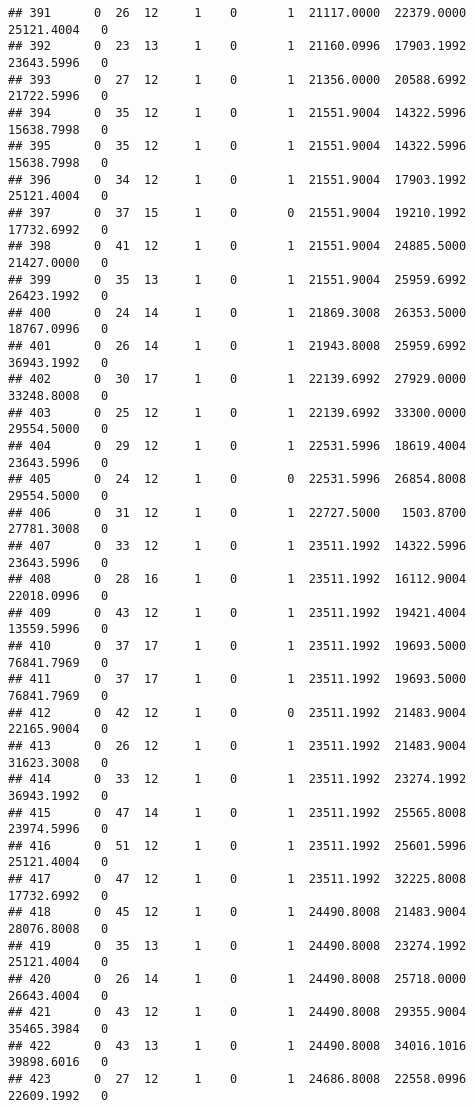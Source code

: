 \documentclass[
]{article}
\begin{document}
\begin{enumerate}
\begin{verbatim}
## 391      0  26  12     1    0       1  21117.0000  22379.0000  25121.4004   0
## 392      0  23  13     1    0       1  21160.0996  17903.1992  23643.5996   0
## 393      0  27  12     1    0       1  21356.0000  20588.6992  21722.5996   0
## 394      0  35  12     1    0       1  21551.9004  14322.5996  15638.7998   0
## 395      0  35  12     1    0       1  21551.9004  14322.5996  15638.7998   0
## 396      0  34  12     1    0       1  21551.9004  17903.1992  25121.4004   0
## 397      0  37  15     1    0       0  21551.9004  19210.1992  17732.6992   0
## 398      0  41  12     1    0       1  21551.9004  24885.5000  21427.0000   0
## 399      0  35  13     1    0       1  21551.9004  25959.6992  26423.1992   0
## 400      0  24  14     1    0       1  21869.3008  26353.5000  18767.0996   0
## 401      0  26  14     1    0       1  21943.8008  25959.6992  36943.1992   0
## 402      0  30  17     1    0       1  22139.6992  27929.0000  33248.8008   0
## 403      0  25  12     1    0       1  22139.6992  33300.0000  29554.5000   0
## 404      0  29  12     1    0       1  22531.5996  18619.4004  23643.5996   0
## 405      0  24  12     1    0       0  22531.5996  26854.8008  29554.5000   0
## 406      0  31  12     1    0       1  22727.5000   1503.8700  27781.3008   0
## 407      0  33  12     1    0       1  23511.1992  14322.5996  23643.5996   0
## 408      0  28  16     1    0       1  23511.1992  16112.9004  22018.0996   0
## 409      0  43  12     1    0       1  23511.1992  19421.4004  13559.5996   0
## 410      0  37  17     1    0       1  23511.1992  19693.5000  76841.7969   0
## 411      0  37  17     1    0       1  23511.1992  19693.5000  76841.7969   0
## 412      0  42  12     1    0       0  23511.1992  21483.9004  22165.9004   0
## 413      0  26  12     1    0       1  23511.1992  21483.9004  31623.3008   0
## 414      0  33  12     1    0       1  23511.1992  23274.1992  36943.1992   0
## 415      0  47  14     1    0       1  23511.1992  25565.8008  23974.5996   0
## 416      0  51  12     1    0       1  23511.1992  25601.5996  25121.4004   0
## 417      0  47  12     1    0       1  23511.1992  32225.8008  17732.6992   0
## 418      0  45  12     1    0       1  24490.8008  21483.9004  28076.8008   0
## 419      0  35  13     1    0       1  24490.8008  23274.1992  25121.4004   0
## 420      0  26  14     1    0       1  24490.8008  25718.0000  26643.4004   0
## 421      0  43  12     1    0       1  24490.8008  29355.9004  35465.3984   0
## 422      0  43  13     1    0       1  24490.8008  34016.1016  39898.6016   0
## 423      0  27  12     1    0       1  24686.8008  22558.0996  22609.1992   0

\end{verbatim}
\end{enumerate}
\end{document}
